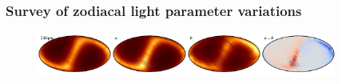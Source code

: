 \documentclass{aa}
\begin{document}

\subsubsection{Survey of zodiacal light parameter variations}

\begin{figure}
    \centering
    \includegraphics[width=0.22\textwidth]{figs/zodi/zodi_10_tot.pdf}\includegraphics[width=0.22\textwidth]{figs/zodi/zodi_10_a.pdf}\includegraphics[width=0.22\textwidth]{figs/zodi/zodi_01_b.pdf}\includegraphics[width=0.22\textwidth]{figs/zodi/zodi_10_a-b.pdf} 
    \vspace{-0.3cm}


\end{figure}
\end{document}
